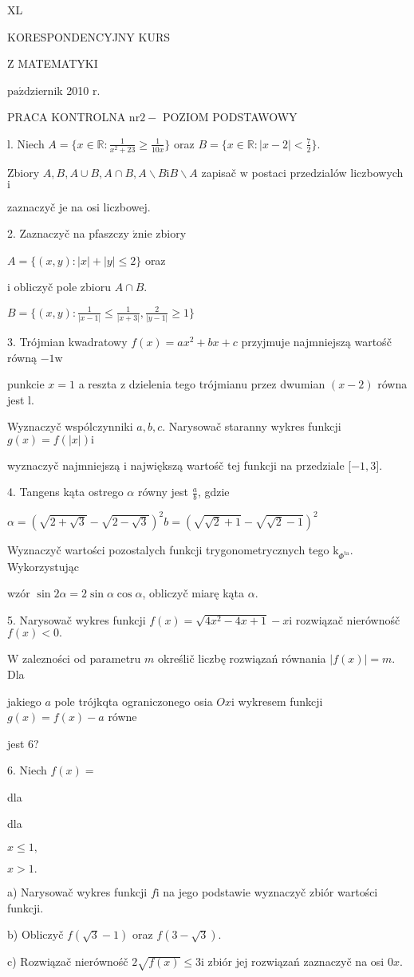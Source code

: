 \documentclass[a4paper,12pt]{article}
\begin{document}
XL

KORESPONDENCYJNY KURS

Z MATEMATYKI

$\mathrm{p}\mathrm{a}\acute{\mathrm{z}}$dziernik 2010 $\mathrm{r}.$

PRACA KONTROLNA $\mathrm{n}\mathrm{r} 2-$ POZIOM PODSTAWOWY

l. Niech $A=\displaystyle \{x\in \mathbb{R}:\frac{1}{x^{2}+23}\geq\frac{1}{10x}\}$ oraz $B=\displaystyle \{x\in \mathbb{R}:|x-2|<\frac{7}{2}\}.$

Zbiory $A, B, A\cup B, A\cap B, A\backslash B\mathrm{i}B\backslash A$ zapisač $\mathrm{w}$ postaci przedzialów liczbowych $\mathrm{i}$

zaznaczyč je na osi liczbowej.

2. Zaznaczyč na pfaszczy $\acute{\mathrm{z}}\mathrm{n}\mathrm{i}\mathrm{e}$ zbiory

$A=\{(x,y):|x|+|y|\leq 2\}$ oraz

$\mathrm{i}$ obliczyč pole zbioru $A\cap B.$

$B=\displaystyle \{(x,y):\frac{1}{|x-1|}\leq\frac{1}{|x+3|},\frac{2}{|y-1|}\geq 1\}$

3. Trójmian kwadratowy $f(x)=ax^{2}+bx+c$ przyjmuje najmniejszą wartośč równą $-1 \mathrm{w}$

punkcie $x=1$ a reszta $\mathrm{z}$ dzielenia tego trójmianu przez dwumian $(x-2)$ równa jest l.

Wyznaczyč wspólczynniki $a, b, c$. Narysowač staranny wykres funkcji $g(x) = f(|x|) \mathrm{i}$

wyznaczyč najmniejszą $\mathrm{i}$ największą wartośč tej funkcji na przedziale [$-1,3].$

4. Tangens kąta ostrego $\alpha$ równy jest $\displaystyle \frac{a}{b}$, gdzie

$\alpha=(\sqrt{2+\sqrt{3}}-\sqrt{2-\sqrt{3}})^{2}b=(\sqrt{\sqrt{2}+1}-\sqrt{\sqrt{2}-1})^{2}$

Wyznaczyč wartości pozostalych funkcji trygonometrycznych tego $\mathrm{k}_{\Phi^{\mathrm{t}\mathrm{a}}}$. Wykorzystując

wzór $\sin 2\alpha=2\sin\alpha\cos\alpha$, obliczyč miarę kąta $\alpha.$

5. Narysowač wykres funkcji $f(x)=\sqrt{4x^{2}-4x+1}-x \mathrm{i}$ rozwiązač nierównośč $f(x)<0.$

$\mathrm{W}$ zalezności od parametru $m$ określič liczbę rozwiązań równania $|f(x)| = m$. Dla

jakiego $a$ pole trójkqta ograniczonego osia $Ox\mathrm{i}$ wykresem funkcji $g(x)=f(x)-a$ równe

jest 6?

6. Niech $f(x)=$

dla

dla

$x\leq 1,$

$x>1.$

a) Narysowač wykres funkcji $f\mathrm{i}$ na jego podstawie wyznaczyč zbiór wartości funkcji.

b) Obliczyč $f(\sqrt{3}-1)$ oraz $f(3-\sqrt{3}).$

c) Rozwiązač nierównośč $2\sqrt{f(x)}\leq 3\mathrm{i}$ zbiór jej rozwiązań zaznaczyč na osi $0x.$
\end{document}
